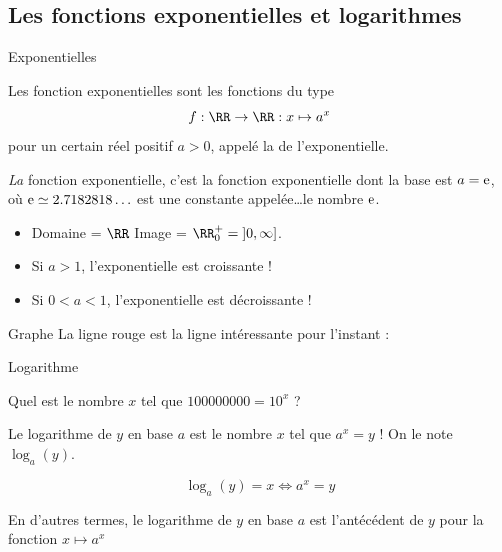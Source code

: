 \subsection{Les fonctions exponentielles et logarithmes}\label{fctlog}
\begin{frame}{Exponentielles}
  \begin{definition}
    Les fonction exponentielles sont les fonctions du type
    \begin{equation*}
      f : \RR \to \RR : x \mapsto a^x
    \end{equation*}
    pour un certain réel positif $a > 0$, appelé la  de l'exponentielle.
  \end{definition}\pause

  \begin{definition}
    \emph{La} fonction exponentielle, c'est la fonction exponentielle dont la base est $a = \textup{e}$, où $\textup{e} \simeq 2.7182818\ldots$ est une constante appelée\dots \og le nombre $\textup{e}$.\fg{} %
  \end{definition}\pause
  
  \begin{remark}
    \begin{itemize}
    \item Domaine = $\RR$ \qquad Image = $\RR_0^+ = \mathopen]0,\infty\mathclose]$.
    \item Si \(a > 1\), l'exponentielle est croissante !
    \item Si \(0 < a < 1\), l'exponentielle est décroissante !
    \end{itemize}
  \end{remark}
\end{frame}

\begin{frame}{Graphe}
  La ligne rouge est la ligne intéressante pour l'instant :
  \begin{center}
  \end{center}
\end{frame}

\begin{frame}{Logarithme}
  \begin{question}
    Quel est le nombre \(x\) tel que \(100000000 = 10^x\) ?
  \end{question}\pause
  \begin{definition}
    Le logarithme de \(y\) en base \(a\) est le nombre \(x\) tel que \(a^{x} = y\) ! On le note \(\log_{a}(y)\).
  \end{definition}
  \pause
  \begin{equation*}
    \log_a (y) = x \iff a^{x} = y
  \end{equation*}
  \pause
  \begin{remark*}
    En d'autres termes, le logarithme de \(y\) en base \(a\) est l'antécédent de \(y\) pour la fonction \(x\mapsto a^{x}\)
  \end{remark*}
\end{frame}

